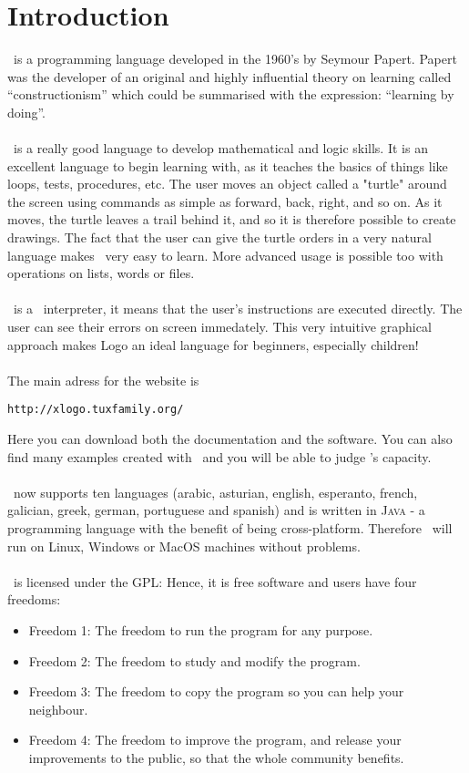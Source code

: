 \chapter{Introduction}
\logo\ is a programming language developed in the 1960's by Seymour Papert. Papert was the developer of an original and highly influential theory on learning called ``constructionism'' which could be summarised with the expression: ``learning by doing''.\\ \\
\logo\ is a really good language to develop mathematical and logic skills. It is an excellent language to begin learning with, as it teaches the basics of things like loops, tests, procedures, etc. The user moves an object called a "turtle" around the screen using commands as simple as forward, back, right, and so on. As it moves, the turtle leaves a trail behind it, and so it is therefore possible to create drawings. The fact that the user can give the turtle orders in a very natural language makes \logo\ very easy to learn. More advanced usage is possible too with operations on lists, words or files.\\ \\
\xlogo\ is a \logo\ interpreter, it means that the user's instructions are executed directly. The user can see their errors on screen immedately. This very intuitive graphical approach makes Logo an ideal language for beginners, especially children!\\ \\
The main adress for the \xlogo website is
\begin{center}
\texttt{http://xlogo.tuxfamily.org/}
\end{center}
Here you can download both the documentation and the software. You can also find many examples created with \xlogo\ and you will be able to judge \xlogo's capacity.\\ \\
\xlogo\ now supports ten languages (arabic, asturian, english, esperanto, french, galician, greek, german, portuguese and spanish) and is written in \textsc{Java} - a programming language with the benefit of being cross-platform. Therefore \xlogo\ will run on Linux, Windows or MacOS machines without problems.\\ \\
\xlogo\  is licensed under the GPL: Hence, it is free software and users have four freedoms:
\begin{itemize}
\item Freedom 1: The freedom to run the program for any purpose.
\item Freedom 2: The freedom to study and modify the program.
\item Freedom 3: The freedom to copy the program so you can help your neighbour.
\item Freedom 4: The freedom to improve the program, and release your improvements to the public, so that the whole community benefits.
\end{itemize}
